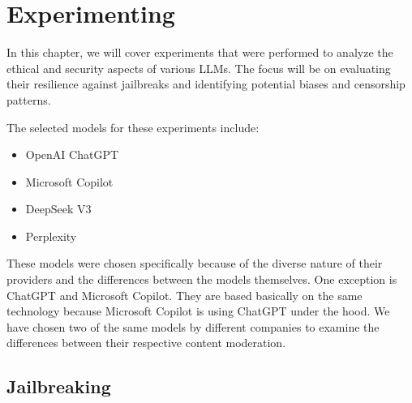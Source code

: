 \chapter{Experimenting}


In this chapter, we will cover experiments that were performed to analyze the ethical and security aspects of various LLMs. The focus will be on evaluating their resilience against jailbreaks and identifying potential biases and censorship patterns.

The selected models for these experiments include:
\begin{itemize}
    \item OpenAI ChatGPT
    \item Microsoft Copilot
    \item DeepSeek V3
    \item Perplexity
\end{itemize}

These models were chosen specifically because of the diverse nature of their providers and the differences between the models themselves. One exception is ChatGPT and Microsoft Copilot. They are based basically on the same technology because Microsoft Copilot is using ChatGPT under the hood. We have chosen two of the same models by different companies to examine the differences between their respective content moderation.



\section{Jailbreaking}



